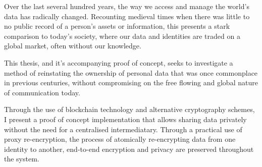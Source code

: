 \abstract

\thispagestyle{plain}
\setcounter{page}{1}

Over the last several hundred years, the way we access and manage the world's data has radically changed. Recounting medieval times when there was little to no public record of a person's assets or information, this presents a stark comparison to today's society, where our data and identities are traded on a global market, often without our knowledge.

This thesis, and it's accompanying proof of concept, seeks to investigate a method of reinstating the ownership of personal data that was once commonplace in previous centuries, without compromising on the free flowing and global nature of communication today.

Through the use of blockchain technology and alternative cryptography schemes, I present a proof of concept implementation that allows sharing data privately without the need for a centralised intermediatary. Through a practical use of proxy re-encryption, the process of atomically re-encrypting data from one identity to another, end-to-end encryption and privacy are preserved throughout the system.
